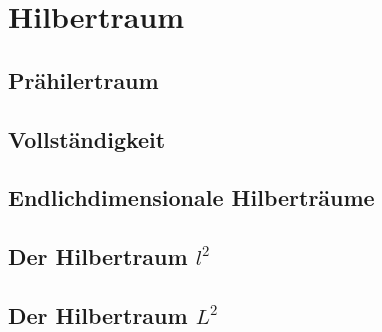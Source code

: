 %
%
%
\section{Hilbertraum
\label{buch:skalarprodukt:section:hilbertraum}}

\subsection{Prähilertraum}

\subsection{Vollständigkeit}

\subsection{Endlichdimensionale Hilberträume}

\subsection{Der Hilbertraum $l^2$}

\subsection{Der Hilbertraum $L^2$}


